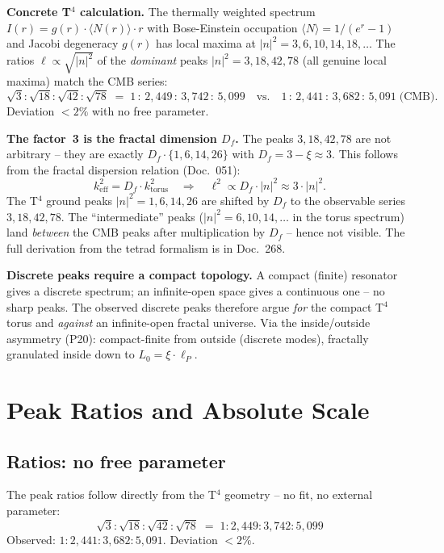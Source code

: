 \textbf{Concrete T$^4$ calculation.}
The thermally weighted spectrum $I(r) = g(r)\cdot\langle N(r)\rangle\cdot r$
with Bose-Einstein occupation $\langle N\rangle = 1/(e^r-1)$ and Jacobi
degeneracy $g(r)$ has local maxima at $|n|^2 = 3, 6, 10, 14, 18, \ldots$
The ratios $\ell \propto \sqrt{|n|^2}$ of the \emph{dominant} peaks
$|n|^2 = 3, 18, 42, 78$ (all genuine local maxima) match the CMB series:
\[
  \sqrt{3}:\sqrt{18}:\sqrt{42}:\sqrt{78}
  \;=\; 1\,:\,2{,}449\,:\,3{,}742\,:\,5{,}099
  \quad\text{vs.}\quad
  1\,:\,2{,}441\,:\,3{,}682\,:\,5{,}091\;\text{(CMB)}.
\]
Deviation $< 2\%$ with no free parameter.

\textbf{The factor~3 is the fractal dimension $D_f$.}
The peaks $3, 18, 42, 78$ are not arbitrary -- they are exactly
$D_f \cdot \{1, 6, 14, 26\}$ with $D_f = 3 - \xi \approx 3$.
This follows from the fractal dispersion relation (Doc.~051):
\[
  k_\mathrm{eff}^2 = D_f \cdot k_\mathrm{torus}^2
  \quad\Rightarrow\quad
  \ell^2 \propto D_f \cdot |n|^2 \approx 3\cdot|n|^2.
\]
The T$^4$ ground peaks $|n|^2 = 1, 6, 14, 26$ are shifted by $D_f$
to the observable series $3, 18, 42, 78$.
The ``intermediate'' peaks ($|n|^2 = 6, 10, 14, \ldots$
in the torus spectrum) land \emph{between} the CMB peaks after
multiplication by $D_f$ -- hence not visible.
The full derivation from the tetrad formalism is in Doc.~268.

\textbf{Discrete peaks require a compact topology.} A compact (finite)
resonator gives a discrete spectrum; an infinite-open space gives a
continuous one -- no sharp peaks. The observed discrete peaks therefore
argue \emph{for} the compact T$^4$ torus and \emph{against} an
infinite-open fractal universe. Via the inside/outside asymmetry (P20):
compact-finite from outside (discrete modes), fractally granulated inside
down to $L_0 = \xi\cdot\ell_P$.

\section{Peak Ratios and Absolute Scale}

\subsection*{Ratios: no free parameter}

The peak ratios follow directly from the T$^4$ geometry --
no fit, no external parameter:
\[
  \sqrt{3}:\sqrt{18}:\sqrt{42}:\sqrt{78}
  \;=\; 1:2{,}449:3{,}742:5{,}099
\]
Observed: $1:2{,}441:3{,}682:5{,}091$. Deviation $< 2\%$.

